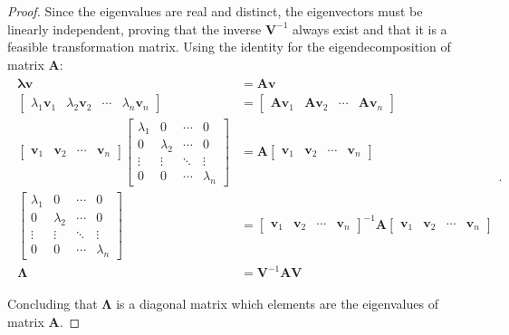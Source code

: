 \documentclass[a4paper,11pt]{book}
\numberwithin{figure}{chapter}
\numberwithin{equation}{chapter}
\numberwithin{table}{chapter}
\theoremstyle{definition}
\begin{document}
\begin{proof}
    Since the eigenvalues are real and distinct, the eigenvectors must be linearly independent, proving that the inverse $\bm{V}^{-1}$ always exist and that it is a feasible transformation matrix. Using the identity for the eigendecomposition of matrix $\bm{A}$:
    \begin{align}
    \begin{split}
        \bm{\lambda} \bm{v} &= \bm{A} \bm{v} \\
        \begin{bmatrix} \lambda_1 \bm{v}_1 & \lambda_2 \bm{v}_2 & \cdots & \lambda_n \bm{v}_n \end{bmatrix} &= \begin{bmatrix} \bm{A} \bm{v}_1 & \bm{A} \bm{v}_2 & \cdots & \bm{A} \bm{v}_n  \end{bmatrix} \\
        \begin{bmatrix} \bm{v}_1 & \bm{v}_2 & \cdots & \bm{v}_n \end{bmatrix} \begin{bmatrix} \lambda_1 & 0 & \cdots & 0 \\ 0 & \lambda_2 & \cdots & 0 \\ \vdots & \vdots & \ddots & \vdots \\ 0 & 0 & \cdots & \lambda_n  \end{bmatrix} & = \bm{A} \begin{bmatrix} \bm{v}_1 & \bm{v}_2 & \cdots & \bm{v}_n \end{bmatrix} \\
        \begin{bmatrix} \lambda_1 & 0 & \cdots & 0 \\ 0 & \lambda_2 & \cdots & 0 \\ \vdots & \vdots & \ddots & \vdots \\ 0 & 0 & \cdots & \lambda_n  \end{bmatrix} & = \begin{bmatrix} \bm{v}_1 & \bm{v}_2 & \cdots & \bm{v}_n \end{bmatrix}^{-1} \bm{A} \begin{bmatrix} \bm{v}_1 & \bm{v}_2 & \cdots & \bm{v}_n \end{bmatrix} \\
        \bm{\Lambda}  &= \bm{V}^{-1} \bm{A} \bm{V}
    \end{split}
    .\end{align}
    
    Concluding that $\bm{\Lambda}$ is a diagonal matrix which elements are the eigenvalues of matrix $\bm{A}$.
\end{proof}
\end{document}
